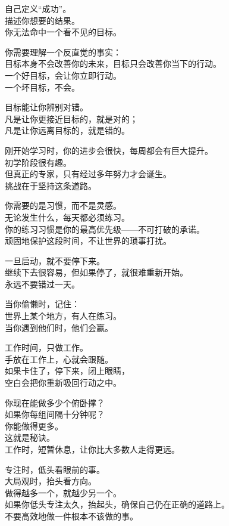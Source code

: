 \documentclass[
]{article}
\begin{document}
自己定义``成功''。\\
描述你想要的结果。\\
你无法命中一个看不见的目标。

你需要理解一个反直觉的事实：\\
目标本身不会改善你的未来，目标只会改善你当下的行动。\\
一个好目标，会让你立即行动。\\
一个坏目标，不会。

目标能让你辨别对错。\\
凡是让你更接近目标的，就是对的；\\
凡是让你远离目标的，就是错的。

刚开始学习时，你的进步会很快，每周都会有巨大提升。\\
初学阶段很有趣。\\
但真正的专家，只有经过多年努力才会诞生。\\
挑战在于坚持这条道路。

你需要的是习惯，而不是灵感。\\
无论发生什么，每天都必须练习。\\
你的练习习惯是你的最高优先级------不可打破的承诺。\\
顽固地保护这段时间，不让世界的琐事打扰。

一旦启动，就不要停下来。\\
继续下去很容易，但如果停了，就很难重新开始。\\
永远不要错过一天。

当你偷懒时，记住：\\
世界上某个地方，有人在练习。\\
当你遇到他们时，他们会赢。

工作时间，只做工作。\\
手放在工作上，心就会跟随。\\
如果卡住了，停下来，闭上眼睛，\\
空白会把你重新吸回行动之中。

你现在能做多少个俯卧撑？\\
如果你每组间隔十分钟呢？\\
你能做得更多。\\
这就是秘诀。\\
工作时，短暂休息，让你比大多数人走得更远。

专注时，低头看眼前的事。\\
大局观时，抬头看方向。\\
做得越多一个，就越少另一个。\\
如果你低头专注太久，抬起头，确保自己仍在正确的道路上。\\
不要高效地做一件根本不该做的事。
\end{document}
